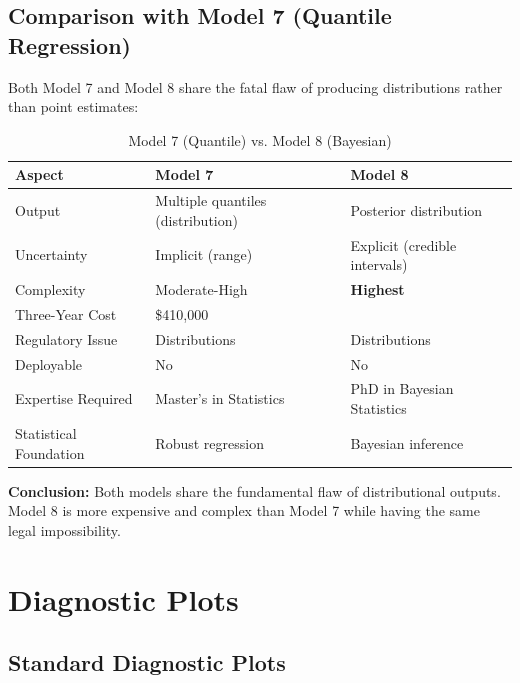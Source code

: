 \subsection{Comparison with Model 7 (Quantile Regression)}

Both Model 7 and Model 8 share the fatal flaw of producing distributions rather than point estimates:

\begin{table}[h]
\centering
\caption{Model 7 (Quantile) vs. Model 8 (Bayesian)}
\begin{tabular}{lll}
\toprule
\textbf{Aspect} & \textbf{Model 7} & \textbf{Model 8} \\
\midrule
Output & Multiple quantiles (distribution) & Posterior distribution \\
Uncertainty & Implicit (range) & Explicit (credible intervals) \\
Complexity & Moderate-High & \textbf{Highest} \\
Three-Year Cost & \$410,000 & \ModelEightThreeYearTCO{} \\
Regulatory Issue & Distributions & Distributions \\
Deployable & No & No \\
Expertise Required & Master's in Statistics & PhD in Bayesian Statistics \\
Statistical Foundation & Robust regression & Bayesian inference \\
\bottomrule
\end{tabular}
\end{table}

\textbf{Conclusion:} Both models share the fundamental flaw of distributional outputs. Model 8 is more expensive and complex than Model 7 while having the same legal impossibility.


\section{Diagnostic Plots}

\subsection{Standard Diagnostic Plots}

